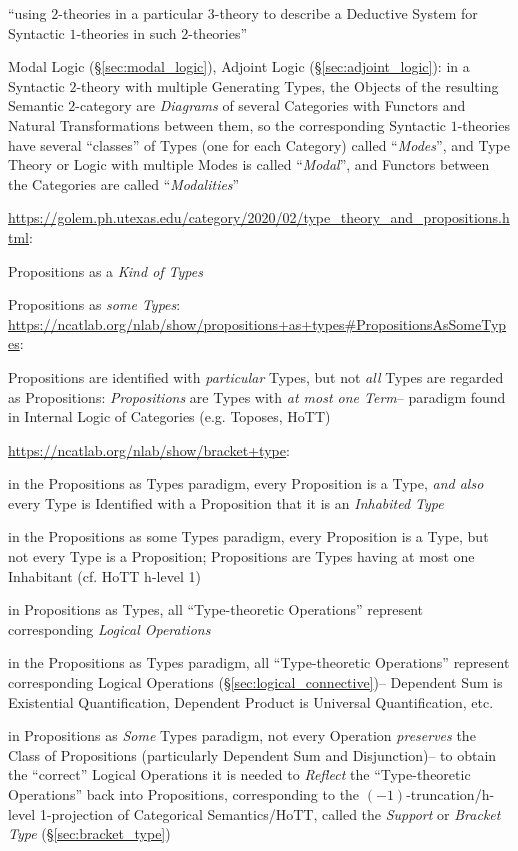 ``using $2$-theories in a particular $3$-theory to describe a Deductive System
for Syntactic $1$-theories in such $2$-theories''

Modal Logic (\S\ref{sec:modal_logic}), Adjoint Logic
(\S\ref{sec:adjoint_logic}): in a Syntactic $2$-theory with multiple Generating
Types, the Objects of the resulting Semantic $2$-category are \emph{Diagrams}
of several Categories with Functors and Natural Transformations between them,
so the corresponding Syntactic $1$-theories have several ``classes'' of Types
(one for each Category) called ``\emph{Modes}'', and Type Theory or Logic
with multiple Modes is called ``\emph{Modal}'', and Functors between the
Categories are called ``\emph{Modalities}''

\asterism

\url{https://golem.ph.utexas.edu/category/2020/02/type_theory_and_propositions.html}:

Propositions as a \emph{Kind of Types}

Propositions as \emph{some Types}:
\url{https://ncatlab.org/nlab/show/propositions+as+types#PropositionsAsSomeTypes}:

Propositions are identified with \emph{particular} Types, but not \emph{all}
Types are regarded as Propositions: \emph{Propositions} are Types with
\emph{at most one Term}-- paradigm found in Internal Logic of Categories (e.g.
Toposes, HoTT)

\url{https://ncatlab.org/nlab/show/bracket+type}:

in the Propositions as Types paradigm, every Proposition is a Type, \emph{and
  also} every Type is Identified with a Proposition that it is an
\emph{Inhabited Type}

in the Propositions as some Types paradigm, every Proposition is a Type, but
not every Type is a Proposition; Propositions are Types having at most one
Inhabitant (cf. HoTT h-level 1)

in Propositions as Types, all ``Type-theoretic Operations'' represent
corresponding \emph{Logical Operations}

in the Propositions as Types paradigm, all ``Type-theoretic Operations''
represent corresponding Logical Operations (\S\ref{sec:logical_connective})--
Dependent Sum is Existential Quantification, Dependent Product is Universal
Quantification, etc.

in Propositions as \emph{Some} Types paradigm, not every Operation
\emph{preserves} the Class of Propositions (particularly Dependent Sum and
Disjunction)-- to obtain the ``correct'' Logical Operations it is needed to
\emph{Reflect} the ``Type-theoretic Operations'' back into Propositions,
corresponding to the $(-1)$-truncation/h-level 1-projection of Categorical
Semantics/HoTT, called the \emph{Support} or \emph{Bracket Type}
(\S\ref{sec:bracket_type})



